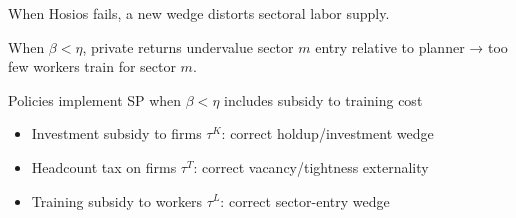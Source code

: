 \documentclass[9pt,xcolor={svgnames}]{beamer}
\begin{document}
\begin{frame}{When Hosios fails, a new wedge distorts sectoral labor supply.}
\begin{itemize}
When $\beta<\eta$, private returns undervalue sector $m$ entry relative to planner → too few workers train for sector $m$.
\end{itemize}



\end{frame}




\begin{frame}{Policies implement SP when $\beta<\eta$ includes subsidy to training cost}
\small

\begin{center}
\end{center}

\begin{itemize}
    \item Investment subsidy to firms $\tau^K$: correct holdup/investment wedge

\item Headcount tax on firms $\tau^T$: correct vacancy/tightness externality

\item Training subsidy to workers $\tau^L$: correct sector-entry wedge 
\end{itemize}

    
\end{frame}
\end{document}
